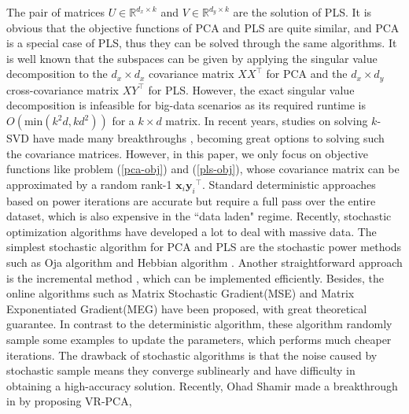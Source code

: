 \documentclass[conference]{IEEEtran}
\begin{document}
The pair of  matrices $U \in \mathbb{R}^{d_x \times k}$ and $V \in \mathbb{R}^{d_y \times k}$ are the solution of PLS. 
It is obvious that the objective functions of PCA and PLS are quite similar, and PCA is a special case of PLS, thus they can be solved through the same algorithms.
It is well known that the subspaces can be given by applying the singular value decomposition to the $d_x \times d_x$ covariance matrix $XX^\top$ for PCA and the $d_x \times d_y$ cross-covariance matrix $XY^\top$ for PLS. However, the exact singular value decomposition is infeasible for big-data scenarios as its required runtime is $O(\mathrm{min}(k^2d,kd^2))$ for a $k \times d$ matrix.
In recent years, studies on solving $k$-SVD have made many breakthroughs \citep{Bhojanapalli2014Tighter}\citep{Musco2015Randomized}\citep{Halko2010Finding},  becoming great options to solving such the covariance matrices. 
However, in this paper, we only focus on objective functions like problem (\ref{pca-obj}) and (\ref{pls-obj}), whose covariance matrix can be approximated by a random rank-1 $\mathbf{x}_{i}{\mathbf{y}_i}^\top$.
Standard deterministic approaches based on power iterations are accurate but require a full pass over the entire dataset, which is also expensive in the ``data laden" regime. Recently, stochastic optimization algorithms have developed a lot to deal with massive data.
The simplest stochastic algorithm for PCA and PLS are the stochastic power methods such as Oja algorithm \citep{Oja1982Simplified} and Hebbian algorithm \citep{Sanger1989Optimal}. Another straightforward approach is the incremental method \citep{Arora2014Stochastic}, which can be implemented efficiently. Besides, the online algorithms such as Matrix Stochastic Gradient(MSE) and Matrix Exponentiated Gradient(MEG) \citep{Arora2016Stochastic}\citep{Arora2013Stochastic} have been proposed, with great theoretical guarantee. In contrast to the deterministic algorithm, these algorithm randomly sample some examples to update the parameters, which performs much cheaper iterations. 
The drawback of stochastic algorithms is that the noise caused by stochastic sample means they converge sublinearly and have difficulty in obtaining a high-accuracy solution.
Recently,  Ohad Shamir made a breakthrough in \citep{Shamir2015Fast} by proposing VR-PCA, 
\end{document}

